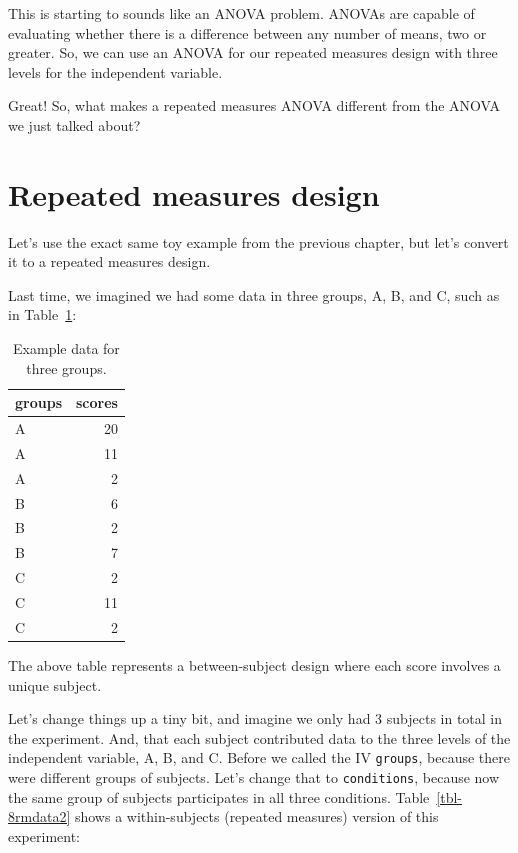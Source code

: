 \documentclass[
  letterpaper,
  DIV=11,
  numbers=noendperiod]{scrreprt}
\begin{document}
This is starting to sounds like an ANOVA problem. ANOVAs are capable of
evaluating whether there is a difference between any number of means,
two or greater. So, we can use an ANOVA for our repeated measures design
with three levels for the independent variable.

Great! So, what makes a repeated measures ANOVA different from the ANOVA
we just talked about?

\section{Repeated measures design}\label{repeated-measures-design}

Let's use the exact same toy example from the previous chapter, but
let's convert it to a repeated measures design.

Last time, we imagined we had some data in three groups, A, B, and C,
such as in Table~\ref{tbl-8rmdata1}:

\begin{longtable}[]{@{}lr@{}}

\caption{\label{tbl-8rmdata1}Example data for three groups.}

\tabularnewline

\toprule\noalign{}
groups & scores \\
\midrule\noalign{}
\endhead
\bottomrule\noalign{}
\endlastfoot
A & 20 \\
A & 11 \\
A & 2 \\
B & 6 \\
B & 2 \\
B & 7 \\
C & 2 \\
C & 11 \\
C & 2 \\

\end{longtable}

The above table represents a between-subject design where each score
involves a unique subject.

Let's change things up a tiny bit, and imagine we only had 3 subjects in
total in the experiment. And, that each subject contributed data to the
three levels of the independent variable, A, B, and C. Before we called
the IV \texttt{groups}, because there were different groups of subjects.
Let's change that to \texttt{conditions}, because now the same group of
subjects participates in all three conditions. Table~\ref{tbl-8rmdata2}
shows a within-subjects (repeated measures) version of this experiment:
\end{document}
